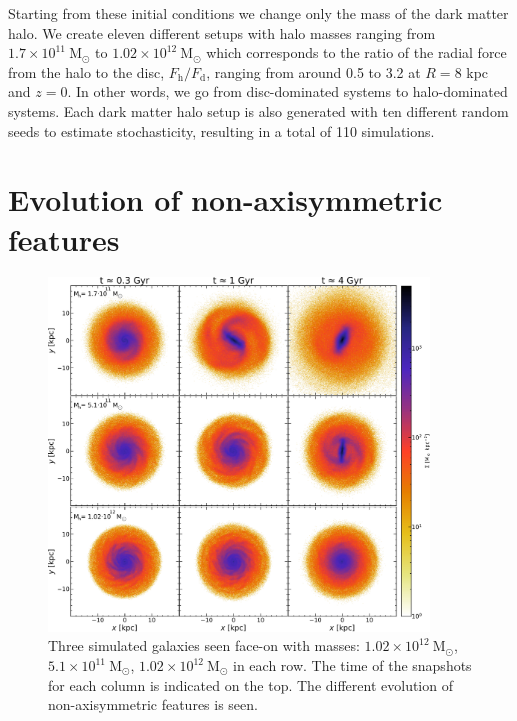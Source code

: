 Starting from these initial conditions we change only the mass of the dark matter halo. We create eleven different setups with halo masses ranging from $1.7\times 10^{11}\ \mathrm{M}_\odot$ to $1.02\times 10^{12}\ \mathrm{M}_\odot$ which corresponds to the ratio of the radial force from the halo to the disc, $F_\mathrm{h}/F_\mathrm{d}$, ranging from around 0.5 to 3.2 at $R = 8$ kpc and $z = 0$. In other words, we go from disc-dominated systems to halo-dominated systems. Each dark matter halo setup is also generated with ten different random seeds to estimate stochasticity, resulting in a total of 110 simulations.

\section{Evolution of non-axisymmetric features}\label{sec:p1-evolution}
\begin{figure}[t]
    \centering
    \includegraphics[width=0.9\textwidth]{images/evolution.pdf}
    \caption{Three simulated galaxies seen face-on with masses: $1.02\times 10^{12}\ \mathrm{M}_\odot$,  $5.1\times 10^{11}\ \mathrm{M}_\odot$, $1.02\times 10^{12}\ \mathrm{M}_\odot$ in each row. The time of the snapshots for each column is indicated on the top. The different evolution of non-axisymmetric features is seen.} %
    \label{fig:evolution}
\end{figure}
